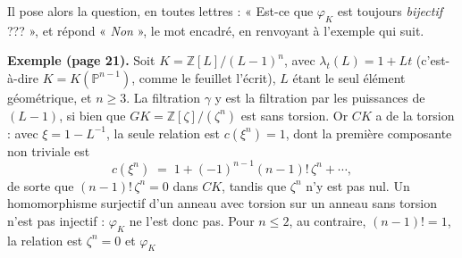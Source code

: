 \documentclass[11pt,a4paper]{article}
\begin{document}
Il pose alors la question, en toutes lettres : « Est-ce que $\varphi_{K}$ est
toujours \emph{bijectif} ??? », et répond « \emph{Non} », le mot encadré, en
renvoyant à l'exemple qui suit.

\textbf{Exemple (page 21).} Soit $K = \mathbb{Z}[L]/(L-1)^{n}$, avec
$\lambda_{t}(L) = 1 + Lt$ (c'est-à-dire $K = K(\mathbb{P}^{n-1})$, comme le
feuillet l'écrit), $L$ étant le seul élément géométrique, et
$n \geqslant 3$. La filtration $\gamma$ y est la filtration par les
puissances de $(L-1)$, si bien que $GK = \mathbb{Z}[\zeta]/(\zeta^{n})$ est sans
torsion. Or $CK$ a de la torsion : avec $\xi = 1 - L^{-1}$, la seule relation
est $c(\xi^{n}) = 1$, dont la première composante non triviale est
\[
  c(\xi^{n}) \;=\; 1 + (-1)^{n-1}(n-1)!\,\zeta^{n} + \cdots ,
\]
de sorte que $(n-1)!\,\zeta^{n} = 0$ dans $CK$, tandis que $\zeta^{n}$ n'y est
pas nul. Un homomorphisme surjectif d'un anneau avec torsion sur un anneau sans
torsion n'est pas injectif : $\varphi_{K}$ ne l'est donc pas. Pour $n \leqslant
2$, au contraire, $(n-1)! = 1$, la relation est $\zeta^{n} = 0$ et $\varphi_{K}$
\end{document}
